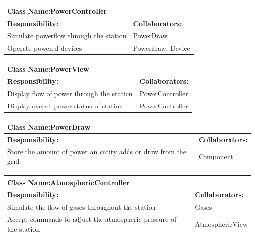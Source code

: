 \documentclass[]{article}
\begin{document}
	\begin{table}[ht]
		\centering
		\begin{tabular}{|p{5cm}|p{5cm}|}
		\hline 
		 \multicolumn{2}{|l|}{\textbf{Class Name:}PowerController} \\
		\hline
		\textbf{Responsibility:} & \textbf{Collaborators:} \\
		\hline 
		Simulate powerflow through the station & PowerDraw \\
		\hline
		Operate powered devices & Powerdraw, Device \\
		\hline
		\end{tabular}	
	\end{table}
	\begin{table}[ht]
		\centering
		\begin{tabular}{|p{5cm}|p{5cm}|}
		\hline 
		 \multicolumn{2}{|l|}{\textbf{Class Name:}PowerView} \\
		\hline
		\textbf{Responsibility:} & \textbf{Collaborators:} \\
		\hline 
		Display flow of power through the station &  PowerController\\
		\hline
		Display overall power status of station &  PowerController\\
		\hline
		\end{tabular}
	\end{table}
	\begin{table}[ht]
		\centering
		\begin{tabular}{|p{5cm}|p{5cm}|}
		\hline 
		 \multicolumn{2}{|l|}{\textbf{Class Name:}PowerDraw} \\
		\hline
		\textbf{Responsibility:} & \textbf{Collaborators:} \\
		\hline 
		Store the amount of power an entity adds or draw from the grid & Component\\
		\hline
		\end{tabular}
	\end{table}
	\begin{table}[ht]
		\centering
		\begin{tabular}{|p{5cm}|p{5cm}|}
		\hline 
		 \multicolumn{2}{|l|}{\textbf{Class Name:}AtmosphericController} \\
		\hline
		\textbf{Responsibility:} & \textbf{Collaborators:} \\
		\hline 
		Simulate the flow of gases throughout the station & Gases\\
		\hline
		Accept commands to adjust the atmospheric pressure of the station & AtmosphericView \\
		\hline
		\end{tabular}
	\end{table}
\end{document}
